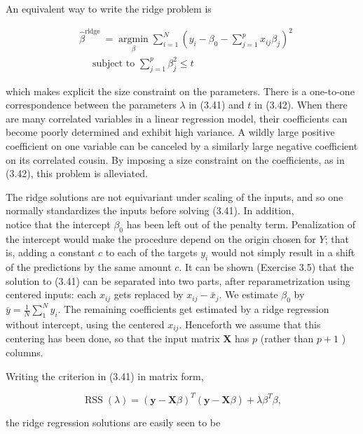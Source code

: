\documentclass[10pt]{article}
\begin{document}
An equivalent way to write the ridge problem is


\begin{align*}
& \hat{\beta}^{\text {ridge }}=\underset{\beta}{\operatorname{argmin}} \sum_{i=1}^{N}\left(y_{i}-\beta_{0}-\sum_{j=1}^{p} x_{i j} \beta_{j}\right)^{2}  \tag{3.42}\\
& \quad \text { subject to } \sum_{j=1}^{p} \beta_{j}^{2} \leq t
\end{align*}


which makes explicit the size constraint on the parameters. There is a one-to-one correspondence between the parameters $\lambda$ in (3.41) and $t$ in (3.42). When there are many correlated variables in a linear regression model, their coefficients can become poorly determined and exhibit high variance. A wildly large positive coefficient on one variable can be canceled by a similarly large negative coefficient on its correlated cousin. By imposing a size constraint on the coefficients, as in (3.42), this problem is alleviated.

The ridge solutions are not equivariant under scaling of the inputs, and so one normally standardizes the inputs before solving (3.41). In addition,\\
notice that the intercept $\beta_{0}$ has been left out of the penalty term. Penalization of the intercept would make the procedure depend on the origin chosen for $Y$; that is, adding a constant $c$ to each of the targets $y_{i}$ would not simply result in a shift of the predictions by the same amount $c$. It can be shown (Exercise 3.5) that the solution to (3.41) can be separated into two parts, after reparametrization using centered inputs: each $x_{i j}$ gets replaced by $x_{i j}-\bar{x}_{j}$. We estimate $\beta_{0}$ by $\bar{y}=\frac{1}{N} \sum_{1}^{N} y_{i}$. The remaining coefficients get estimated by a ridge regression without intercept, using the centered $x_{i j}$. Henceforth we assume that this centering has been done, so that the input matrix $\mathbf{X}$ has $p$ (rather than $p+1$ ) columns.

Writing the criterion in (3.41) in matrix form,


\begin{equation*}
\operatorname{RSS}(\lambda)=(\mathbf{y}-\mathbf{X} \beta)^{T}(\mathbf{y}-\mathbf{X} \beta)+\lambda \beta^{T} \beta, \tag{3.43}
\end{equation*}


the ridge regression solutions are easily seen to be
\end{document}
